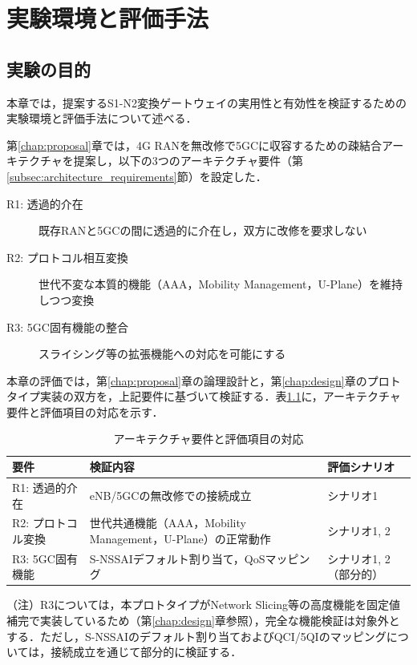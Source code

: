 \chapter{実験環境と評価手法}
\label{chap:experiment}

\section{実験の目的}
本章では，提案するS1-N2変換ゲートウェイの実用性と有効性を検証するための実験環境と評価手法について述べる．

第\ref{chap:proposal}章では，4G RANを無改修で5GCに収容するための疎結合アーキテクチャを提案し，以下の3つのアーキテクチャ要件（第\ref{subsec:architecture_requirements}節）を設定した．
\begin{description}
    \item[R1: 透過的介在] 既存RANと5GCの間に透過的に介在し，双方に改修を要求しない
    \item[R2: プロトコル相互変換] 世代不変な本質的機能（AAA，Mobility Management，U-Plane）を維持しつつ変換
    \item[R3: 5GC固有機能の整合] スライシング等の拡張機能への対応を可能にする
\end{description}

本章の評価では，第\ref{chap:proposal}章の論理設計と，第\ref{chap:design}章のプロトタイプ実装の双方を，上記要件に基づいて検証する．表\ref{tab:requirements_evaluation}に，アーキテクチャ要件と評価項目の対応を示す．

\begin{table}[htbp]
\centering
\caption{アーキテクチャ要件と評価項目の対応}
\label{tab:requirements_evaluation}
\begin{tabular}{|l|p{5cm}|p{4.5cm}|}
\hline
\textbf{要件} & \textbf{検証内容} & \textbf{評価シナリオ} \\
\hline
R1: 透過的介在 & eNB/5GCの無改修での接続成立 & シナリオ1 \\
\hline
R2: プロトコル変換 & 世代共通機能（AAA，Mobility Management，U-Plane）の正常動作 & シナリオ1, 2 \\
\hline
R3: 5GC固有機能 & S-NSSAIデフォルト割り当て，QoSマッピング & シナリオ1, 2（部分的） \\
\hline
\end{tabular}
\end{table}

（注）R3については，本プロトタイプがNetwork Slicing等の高度機能を固定値補完で実装しているため（第\ref{chap:design}章参照），完全な機能検証は対象外とする．ただし，S-NSSAIのデフォルト割り当ておよびQCI/5QIのマッピングについては，接続成立を通じて部分的に検証する．

